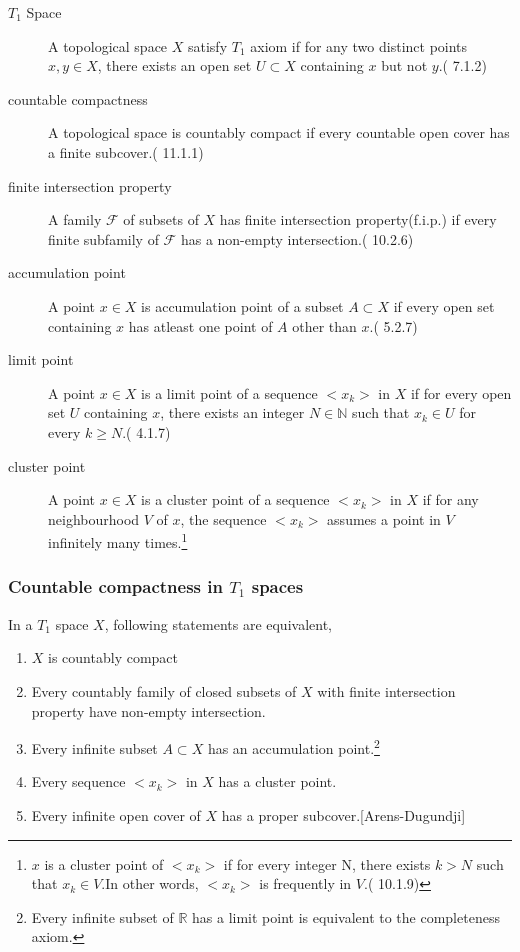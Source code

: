 \begin{description}
	\item[$T_1$ Space] A topological space $X$ satisfy $T_1$ axiom if for any two distinct points $x,y \in X$, there exists an open set $U \subset X$ containing $x$ but not $y$.(\cite{joshi} 7.1.2)
	\item[countable compactness] A topological space is countably compact if every countable open cover has a finite subcover.(\cite{joshi} 11.1.1)
	\item[finite intersection property] A family $\mathcal{F}$ of subsets of $X$ has finite intersection property(f.i.p.) if every finite subfamily of $\mathcal{F}$ has a non-empty intersection.(\cite{joshi} 10.2.6)
	\item[accumulation point] A point $x \in X$ is accumulation point of a subset $A \subset X$ if every open set containing $x$ has atleast one point of $A$ other than $x$.(\cite{joshi} 5.2.7)
	\item[limit point] A point $x \in X$ is a limit point of a sequence $< x_k >$ in $X$ if for every open set $U$ containing $x$, there exists an integer $N \in \mathbb{N}$ such that $x_k \in U$ for every $k \ge N$.(\cite{joshi} 4.1.7)
	\item[cluster point] A point $x \in X$ is a cluster point of a sequence $< x_k >$ in $X$ if for any neighbourhood $V$ of $x$, the sequence $< x_k >$ assumes a point in $V$ infinitely many times.\footnote{$x$ is a cluster point of $< x_k >$ if for every integer N, there exists $k > N$ such that $x_k \in V$.In other words, $< x_k >$ is frequently in $V$.(\cite{joshi} 10.1.9)}
\end{description}

\subsubsection{Countable compactness in $T_1$ spaces}
\begin{theorem}
	In a $T_1$ space $X$, following statements are equivalent,
\begin{enumerate}
	\item $X$ is countably compact
	\item Every countably family of closed subsets of $X$ with finite intersection property have non-empty intersection.
	\item Every infinite subset $A \subset X$ has an accumulation point.\footnote{Every infinite subset of $\mathbb{R}$ has a limit point is equivalent to the completeness axiom.}
	\item Every sequence $< x_k >$ in $X$ has a cluster point.
	\item Every infinite open cover of $X$ has a proper subcover.[Arens-Dugundji]
\end{enumerate}
\end{theorem}

